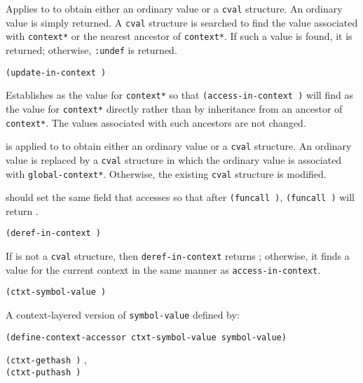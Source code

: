 Applies  to  to obtain either an ordinary
value or a {\tt cval} structure.  An ordinary value is simply
returned.  A {\tt cval} structure is searched to find the value
associated with {\tt *context*} or the nearest ancestor of
{\tt *context*}.  If such a value is found, it is returned;
otherwise, {\tt :undef} is returned.

\begin{tabbing}
{\tt (update-in-context    
                        )}
     \MapsTo {}
\end{tabbing}

Establishes  as the value for {\tt *context*}
so that {\tt (access-in-context  )} will
find  as the value for {\tt *context*} directly
rather than by inheritance from an ancestor of {\tt *context*}. 
The values associated with such ancestors are not changed.

 is applied to  to obtain either an ordinary
value or a {\tt cval} structure.  An ordinary value is replaced by a
{\tt cval} structure in which the ordinary value is associated with
{\tt *global-context*}.  Otherwise, the existing {\tt cval} structure is
modified.

 should set the same field that  accesses
so that after {\tt (funcall   )},
{\tt (funcall  )} will return .

\begin{tabbing}
{\tt (deref-in-context )} \MapsTo {}
\end{tabbing}

If  is not a {\tt cval} structure, then {\tt deref-in-context}
returns ; otherwise, it finds a value for the current context
in the same manner as {\tt access-in-context}.

\begin{tabbing}
{\tt (ctxt-symbol-value )} \MapsTo {}
\end{tabbing}

A context-layered version of {\tt symbol-value} defined by:

\begin{verbatim}
(define-context-accessor ctxt-symbol-value symbol-value)
\end{verbatim}

\begin{tabbing}
{\tt (ctxt-gethash  )}
   \MapsTo {}, \bool \\
{\tt (ctxt-puthash   )}
   \MapsTo {}
\end{tabbing}

